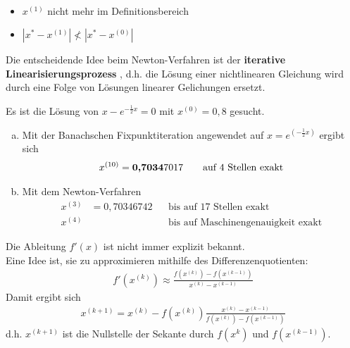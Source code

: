 
\begin{Bspe}~
	\begin{itemize}
		\item $x^{(1)}$ nicht mehr im Definitionsbereich
		\label{im5.4.4(1)}
		\item $|x^{*}-x^{(1)}| \nless |x^{*}-x^{(0)}| $
		\label{im5.4.4(2)}
	\end{itemize}
\end{Bspe}

Die entscheidende Idee beim Newton-Verfahren ist der \textbf{iterative Linearisierungsprozess}
, d.h. die Lösung einer nichtlinearen Gleichung wird
durch eine Folge von Lösungen linearer Gelichungen ersetzt.

\begin{Bspe}
	\label{5.4.6}
	Es ist die Lösung von $x-e^{-\frac{1}{2}x}=0$ mit $x^{(0)}=0,8$ gesucht.
	\begin{enumerate}[a)]
		\item Mit der Banachschen Fixpunktiteration angewendet auf 
		$x=e^{(-\frac{1}{2}x)}$ ergibt sich
		\begin{gather*}
		x^{(10)}=\text{\textbf{0,7034}}7017 
		\qquad \text{auf 4 Stellen exakt}
		\end{gather*}
		\item Mit dem Newton-Verfahren
		\begin{align*}
		x^{(3)}&= 0,70346742 &&\text{bis auf 17 Stellen exakt}\\
		x^{(4)} &&& \text{bis auf Maschinengenauigkeit exakt}
		\end{align*}		
	\end{enumerate}
\end{Bspe}
Die Ableitung $f'(x)$ ist nicht immer explizit bekannt. \\
Eine Idee ist, sie zu approximieren mithilfe des Differenzenquotienten:
\begin{gather*}
f'(x^{(k)})  \approx \frac{f(x^{(k)})-f(x^{(k-1)})}{x^{(k)}-x^{(k-1)}}
\end{gather*}
Damit ergibt sich
\begin{gather*}
x^{(k+1)} = x^{(k)}-f(x^{(k)}) \frac{x^{(k)} - x^{(k-1)}}{f(x^{(k)})-f(x^{(k-1)})}
\end{gather*}
d.h. $x^{(k+1)} $ ist die Nullstelle der Sekante durch $f(x^{k})$ und $f(x^{(k-1)})$.


